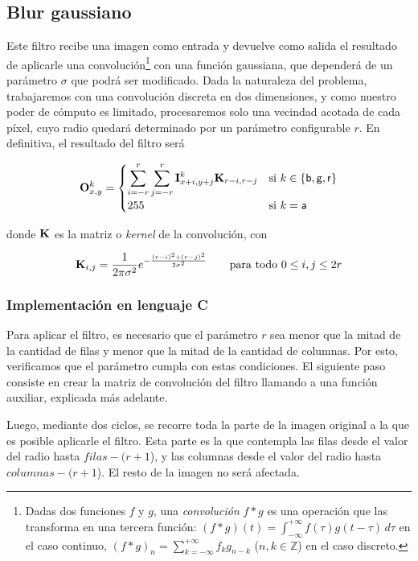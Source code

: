   \subsection{Blur gaussiano}
    Este filtro recibe una imagen como entrada y devuelve como salida el resultado de aplicarle una convolución\footnote{Dadas dos funciones $f$ y $g$, una \emph{convolución} $f * g$ es una operación que las transforma en una tercera función: $(f * g)(t) = \int_{-\infty}^{+\infty} f(\tau) g(t - \tau) \,d\tau$ en el caso continuo, $(f * g)_n = \sum_{k=-\infty}^{+\infty} f_k g_{n-k}$ ($n, k \in \mathbb{Z}$) en el caso discreto.} con una función gaussiana, que dependerá de un parámetro $\sigma$ que podrá ser modificado. Dada la naturaleza del problema, trabajaremos con una convolución discreta en dos dimensiones, y como nuestro poder de cómputo es limitado, procesaremos solo una vecindad acotada de cada píxel, cuyo radio quedará determinado por un parámetro configurable $r$. En definitiva, el resultado del filtro será

    \[ \mathbf{O}_{x,y}^k = \begin{cases}
      \displaystyle \sum_{i=-r}^r \sum_{j=-r}^r \mathbf{I}_{x+i,y+j}^k \mathbf{K}_{r-i,r-j}
        & \text{si } k \in \lbrace \mathsf{b, g, r} \rbrace \\
      255
        & \text{si } k = \mathsf{a}
    \end{cases} \]

    donde $\mathbf{K}$ es la matriz o \emph{kernel} de la convolución, con

    \[ \mathbf{K}_{i,j} = \frac{1}{2 \pi \sigma^2} e^{- \frac{(r-i)^2 + (r-j)^2}{2 \sigma^2}} \qquad \text{para todo } 0 \leq i,j \leq 2r \]

    \subsubsection{Implementación en lenguaje C}

      Para aplicar el filtro, es necesario que el parámetro $r$ sea menor que la mitad de la cantidad de filas y menor que la mitad de la cantidad de columnas. Por esto, verificamos que el parámetro cumpla con estas condiciones. El siguiente paso consiste en crear la matriz de convolución del filtro llamando a una función auxiliar, explicada más adelante. 

      Luego, mediante dos ciclos, se recorre toda la parte de la imagen original a la que es posible aplicarle el filtro. Esta parte es la que contempla las filas desde el valor del radio hasta $filas - (r + 1$), y las columnas desde el valor del radio hasta $columnas - (r + 1$). El resto de la imagen no será afectada. 

